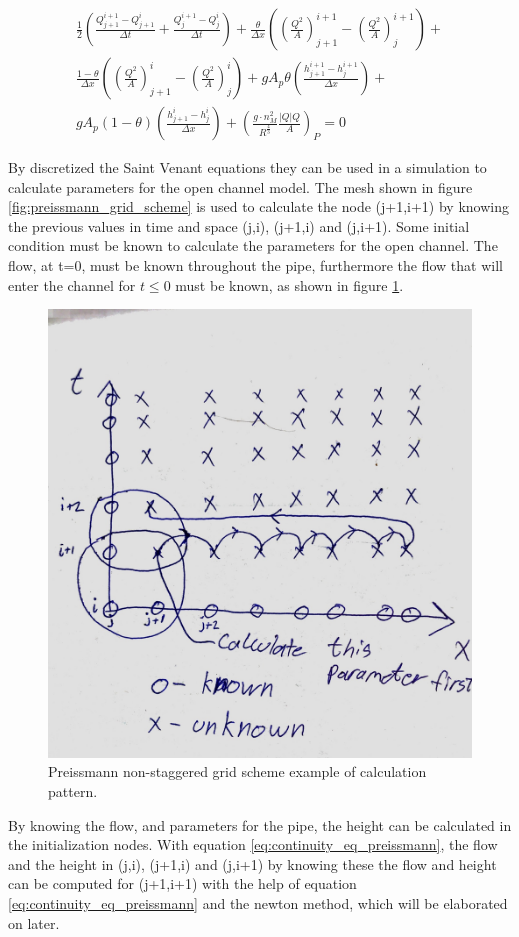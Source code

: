 \begin{multline}
	\frac{1}{2} \left(\frac{Q_{j+1}^{i+1}-Q_{j+1}^i}{\Delta t}+\frac{Q_{j}^{i+1} - Q_j^i}{\Delta t}\right) + \frac{\theta}{\Delta x} \left(\left(\frac{Q^2}{A}\right)_{j+1}^{i+1}-\left(\frac{Q^2}{A}\right)_{j}^{i+1}\right) + \\ \frac{1-\theta}{\Delta x}\left(\left(\frac{Q^2}{A}\right)_{j+1}^{i}-\left(\frac{Q^2}{A}\right)_{j}^{i}\right)+gA_p\theta \left(\frac{h_{j+1}^{i+1}-h_j^{i+1}}{\Delta x}\right)+ \\ gA_p(1-\theta)\left(\frac{h_{j+1}^{i} - h_j^i}{\Delta x}\right)+\left(\frac{g\cdot n_M^2}{R^\frac{4}{3}}\frac{|Q|Q}{A}\right)_P = 0 
\end{multline}

By discretized the Saint Venant equations they can be used in a simulation to calculate parameters for the open channel model. The mesh shown in figure \ref{fig:preissmann_grid_scheme} is used to calculate the node (j+1,i+1) by knowing the previous values in time and space (j,i), (j+1,i) and (j,i+1). Some initial condition must be known to calculate the parameters for the open channel. The flow, at t=0, must be known throughout the pipe, furthermore the flow that will enter the channel for $t\leq 0$ must be known, as shown in figure \ref{fig:preissmann_grid_scheme_exampel}.   

\begin{figure}[H]
\centering
\includegraphics[width=.6\textwidth]{report/modeling/pictures/preissmann_scheme_exempel}
\caption{Preissmann non-staggered grid scheme example of calculation pattern.}
\label{fig:preissmann_grid_scheme_exampel}
\end{figure} 

By knowing the flow, and parameters for the pipe, the height can be calculated in the initialization nodes. With equation \ref{eq:continuity_eq_preissmann}, the flow and the height in (j,i), (j+1,i) and (j,i+1) by knowing these the flow and height can be computed for (j+1,i+1) with the help of equation \ref{eq:continuity_eq_preissmann} and the newton method, which will be elaborated on later.  

